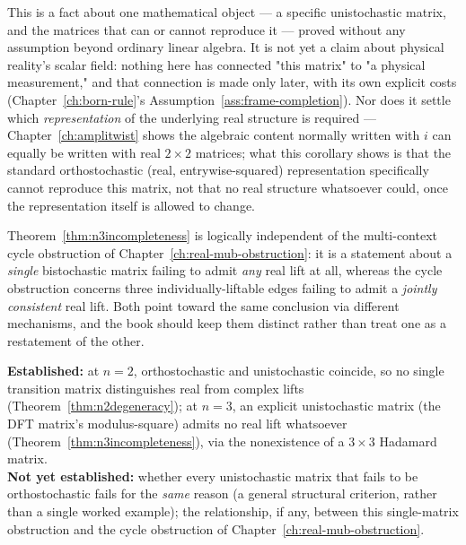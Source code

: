 \begin{scopebox}
\scopetitle{}This is a fact about one mathematical object — a specific
unistochastic matrix, and the matrices that can or cannot reproduce it —
proved without any assumption beyond ordinary linear algebra. It is not
yet a claim about physical reality's scalar field: nothing here has
connected "this matrix" to "a physical measurement," and that connection
is made only later, with its own explicit costs
(Chapter~\ref{ch:born-rule}'s Assumption~\ref{ass:frame-completion}).
Nor does it settle which \emph{representation} of the underlying real
structure is required — Chapter~\ref{ch:amplitwist} shows the algebraic
content normally written with $i$ can equally be written with real
$2\times2$ matrices; what this corollary shows is that the standard
orthostochastic (real, entrywise-squared) representation specifically
cannot reproduce this matrix, not that no real structure whatsoever
could, once the representation itself is allowed to change.
\end{scopebox}

\begin{remark}
Theorem~\ref{thm:n3incompleteness} is logically independent of the multi-context
cycle obstruction of Chapter~\ref{ch:real-mub-obstruction}: it is a statement
about a \emph{single} bistochastic matrix failing to admit \emph{any} real lift
at all, whereas the cycle obstruction concerns three individually-liftable edges
failing to admit a \emph{jointly consistent} real lift. Both point toward the
same conclusion via different mechanisms, and the book should keep them
distinct rather than treat one as a restatement of the other.
\end{remark}

\begin{ledgerentry}
\textbf{Established:} at $n=2$, orthostochastic and unistochastic coincide,
so no single transition matrix distinguishes real from complex lifts
(Theorem~\ref{thm:n2degeneracy}); at $n=3$, an explicit unistochastic matrix
(the DFT matrix's modulus-square) admits no real lift whatsoever
(Theorem~\ref{thm:n3incompleteness}), via the nonexistence of a $3\times3$
Hadamard matrix.\\
\textbf{Not yet established:} whether every unistochastic matrix that fails to be
orthostochastic fails for the \emph{same} reason (a general structural
criterion, rather than a single worked example); the relationship, if any,
between this single-matrix obstruction and the cycle obstruction of
Chapter~\ref{ch:real-mub-obstruction}.
\end{ledgerentry}
